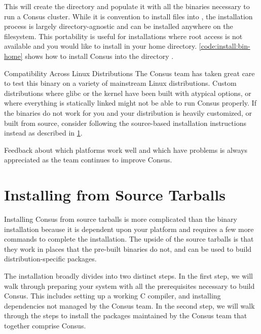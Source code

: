 
This will create the directory  and populate it with all
the binaries necessary to run a Consus cluster.  While it is convention to
install files into , the installation process is largely
directory-agnostic and can be installed anywhere on the filesystem.  This
portability is useful for installations where root access is not available and
you would like to install in your home directory.  \cref{code:install:bin-home}
shows how to install Consus into the directory .


\begin{consuscaution}{Compatibility Across Linux Distributions}
    The Consus team has taken great care to test this binary on a variety of
    mainstream Linux distributions.  Custom distributions where glibc or the
    kernel have been built with atypical options, or where everything is
    statically linked might not be able to run Consus properly.  If the binaries
    do not work for you and your distribution is heavily customized, or built
    from source, consider following the source-based installation instructions
    instead as described in \cref{sec:install:src}.

    \phantom{p}
    
    Feedback about which platforms work well and which have problems is always
    appreciated as the team continues to improve Consus.
\end{consuscaution}

\section{Installing from Source Tarballs}
\label{sec:install:src}

Installing Consus from source tarballs is more complicated than the binary
installation because it is dependent upon your platform and requires a few more
commands to complete the installation.  The upside of the source tarballs is
that they work in places that the pre-built binaries do not, and can be used to
build distribution-specific packages.

The installation broadly divides into two distinct steps.  In the first step, we
will walk through preparing your system with all the prerequisites necessary to
build Consus.  This includes setting up a working C compiler, and installing
dependencies not managed by the Consus team.  In the second step, we will walk
through the steps to install the packages maintained by the Consus team that
together comprise Consus.

